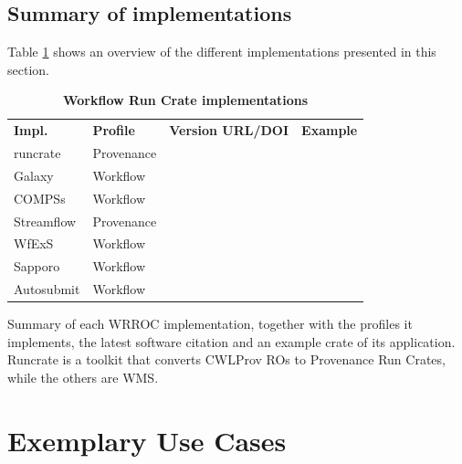 \documentclass[10pt,letterpaper]{article}
\newlength\savedwidth
\newcommand\thickhline{\noalign{\global\savedwidth\arrayrulewidth\global\arrayrulewidth 2pt}%
\hline
\noalign{\global\arrayrulewidth\savedwidth}}
\begin{document}
\subsection{Summary of implementations}

Table \ref{implementation_summary_table} shows an overview of the different implementations presented in this section.


\begin{table}[!ht]
  \begin{adjustwidth}{-1.4cm}{0in} %
  \centering
  \caption{
  {\bf Workflow Run Crate implementations}}
  \begin{tabular}{l|l|l|l}
  \hline
  {\bf Impl.} & {\bf Profile} & {\bf Version URL/DOI} &
  {\bf Example}\\
  \thickhline
  runcrate & Provenance & \footnotesize \cite{runcrate}  & \footnotesize \cite{run-pathology} \\
  Galaxy & Workflow & \footnotesize \cite{Galaxy 2023} & \footnotesize \cite{De Geest 2023} \\
  COMPSs & Workflow & \footnotesize \cite{Ejarque 2023} & \footnotesize \cite{Poiata 2023} \\
  Streamflow & Provenance & \footnotesize \cite{Colonnelli 2023b} & \footnotesize \cite{Colonnelli 2023} \\
  WfExS & Workflow & \footnotesize \cite{Fernández 2023a} & \footnotesize \cite{Fernández 2023b} \\
  Sapporo & Workflow & \footnotesize \cite{Suetake 2023b} & \footnotesize \cite{Ohta 2023} \\
  Autosubmit & Workflow & \footnotesize \cite{Beltrán 2023} & \footnotesize \cite{Kinoshita 2023} \\
  \end{tabular}
  \begin{flushleft} 
    Summary of each WRROC implementation, together with the profiles it implements, the latest software citation and an example crate of its application. Runcrate is a toolkit that converts CWLProv ROs to Provenance Run Crates, while the others are WMS.
  \end{flushleft}
  \label{implementation_summary_table}
  \end{adjustwidth}
\end{table}
  


\section{Exemplary Use Cases}\label{exemplary-use-cases}
\end{document}
